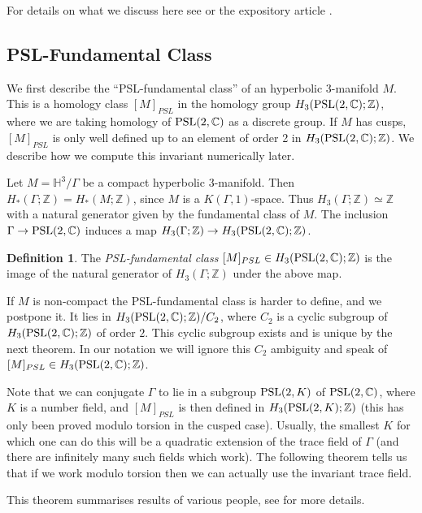 \documentclass[a4paper]{amsart}
\def\H{{\mathbb H}}
\def\Z{{\mathbb Z}}
\def\C{{\mathbb C}}
\def\psl2c{\mbox{\rm PSL}(2,\C)}
\theoremstyle{definition}
\newtheorem{definition}[theorem]{Definition}
\begin{document}
For details on what we discuss here see \cite{neumann-in-progress,
neumann-yang2, neumann-yang3} or the expository article
\cite{neumann-hilbert}. 

\subsection{PSL-Fundamental Class} We first describe the
``PSL-fundamental class'' of an hyperbolic $3$-manifold $M$. This is a
homology class $[M]_{PSL}$ in the homology group $H_3(\psl2c;\Z)$,
where we are taking homology of $\psl2c$ as a discrete group. If $M$
has cusps, $[M]_{PSL}$ is only well defined up to an element of order
2 in $H_3(\psl2c;\Z)$. We describe how we compute this invariant
numerically later.

Let $M=\H^3/\Gamma$ be a compact hyperbolic $3$-manifold. Then
$H_*(\Gamma;\Z)=H_*(M;\Z)$, since $M$ is a $K(\Gamma,1)$-space. Thus
$H_3(\Gamma;\Z)\simeq\Z$ with a natural generator given by the
fundamental class of $M$. The inclusion $\Gamma\to\psl2c$ induces a
map $H_3(\Gamma;\Z)\to H_3(\psl2c;\Z)$.

\begin{definition} The \emph{PSL-fundamental class}
$[M]_{PSL}\in H_3(\psl2c;\Z)$ is the image of the natural generator of
$H_3(\Gamma;\Z)$ under the above map. \end{definition}

If $M$ is non-compact the PSL-fundamental class is harder to define,
and we postpone it. It lies in $H_3(\psl2c;\Z)/C_2$, where $C_2$ is a
cyclic subgroup of $H_3(\psl2c;\Z)$ of order $2$. This cyclic subgroup
exists and is unique by the next theorem. In our notation we will
ignore this $C_2$ ambiguity and speak of $[M]_{PSL}\in H_3(\psl2c;\Z)$.

Note that we can conjugate $\Gamma$ to lie in a subgroup $\operatorname{PSL}(2,K)$
of $\psl2c$, where $K$ is a number field, and $[M]_{PSL}$ is then
defined in $H_3(\PSL(2,K);\Z)$ (this has only been proved modulo
torsion in the cusped case). Usually, the smallest $K$ for which one
can do this will be a quadratic extension of the trace field of
$\Gamma$ (and there are infinitely many such fields which work). The
following theorem tells us that if we work modulo torsion then we can
actually use the invariant trace field.

This theorem summarises results of various people, see
\cite{neumann-yang3} for more details.
\end{document}
